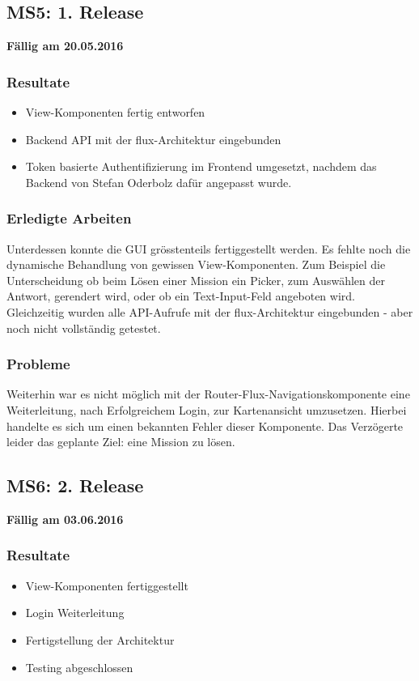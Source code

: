 \subsection{MS5: 1. Release}
\label{pm-ms5}
\textbf{Fällig am 20.05.2016}
\subsubsection{Resultate}
\begin{itemize}
	\item View-Komponenten fertig entworfen
	\item Backend API mit der flux-Architektur eingebunden
	\item Token basierte Authentifizierung im Frontend umgesetzt, nachdem das Backend von Stefan Oderbolz dafür angepasst wurde.
\end{itemize}

\subsubsection{Erledigte Arbeiten}
Unterdessen konnte die GUI grösstenteils fertiggestellt werden. 
Es fehlte noch die dynamische Behandlung von gewissen View-Komponenten.
Zum Beispiel die Unterscheidung ob beim Lösen einer Mission ein Picker, zum Auswählen der Antwort, gerendert wird, oder ob ein Text-Input-Feld angeboten wird.
Gleichzeitig wurden alle API-Aufrufe mit der flux-Architektur eingebunden - aber noch nicht vollständig getestet.

\subsubsection{Probleme}
Weiterhin war es nicht möglich mit der Router-Flux-Navigationskomponente eine Weiterleitung, nach Erfolgreichem Login, zur Kartenansicht umzusetzen.
Hierbei handelte es sich um einen bekannten Fehler dieser Komponente.
Das Verzögerte leider das geplante Ziel: eine Mission zu lösen.

\subsection{MS6: 2. Release}
\label{pm-ms6}
\textbf{Fällig am 03.06.2016}
\subsubsection{Resultate}
\begin{itemize}
	\item View-Komponenten fertiggestellt
	\item Login Weiterleitung
	\item Fertigstellung der Architektur
	\item Testing abgeschlossen
\end{itemize}

